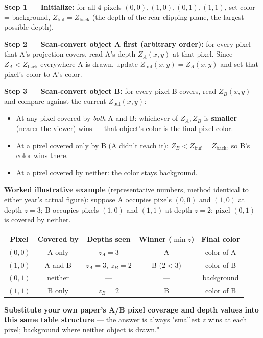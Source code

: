 \documentclass[12pt, a4paper]{article}
\newenvironment{solutionbox}{\begin{mdframed}[style=solutionframe]}{\end{mdframed}}
\begin{document}
\begin{solutionbox}
\textbf{Step 1 --- Initialize:} for all 4 pixels $(0,0),(1,0),(0,1),(1,1)$, set color = background, $Z_{\mathrm{buf}} = Z_{\mathrm{back}}$ (the depth of the rear clipping plane, the largest possible depth).

\textbf{Step 2 --- Scan-convert object A first (arbitrary order):} for every pixel that A's projection covers, read A's depth $Z_A(x,y)$ at that pixel. Since $Z_A < Z_{\mathrm{back}}$ everywhere A is drawn, update $Z_{\mathrm{buf}}(x,y)=Z_A(x,y)$ and set that pixel's color to A's color.

\textbf{Step 3 --- Scan-convert object B:} for every pixel B covers, read $Z_B(x,y)$ and compare against the current $Z_{\mathrm{buf}}(x,y)$:
\begin{itemize}[noitemsep]
  \item At any pixel covered by \emph{both} A and B: whichever of $Z_A,Z_B$ is \textbf{smaller} (nearer the viewer) wins --- that object's color is the final pixel color.
  \item At a pixel covered only by B (A didn't reach it): $Z_B < Z_{\mathrm{buf}}=Z_{\mathrm{back}}$, so B's color wins there.
  \item At a pixel covered by neither: the color stays background.
\end{itemize}

\textbf{Worked illustrative example} (representative numbers, method identical to either year's actual figure): suppose A occupies pixels $(0,0)$ and $(1,0)$ at depth $z=3$; B occupies pixels $(1,0)$ and $(1,1)$ at depth $z=2$; pixel $(0,1)$ is covered by neither.
\begin{center}
\begin{tabular}{ccccc}
\toprule
Pixel & Covered by & Depths seen & Winner ($\min z$) & Final color \\
\midrule
$(0,0)$ & A only & $z_A=3$ & A & color of A \\
$(1,0)$ & A and B & $z_A=3,\ z_B=2$ & B ($2<3$) & color of B \\
$(0,1)$ & neither & --- & --- & background \\
$(1,1)$ & B only & $z_B=2$ & B & color of B \\
\bottomrule
\end{tabular}
\end{center}
\textbf{Substitute your own paper's A/B pixel coverage and depth values into this same table structure} --- the answer is always "smallest $z$ wins at each pixel; background where neither object is drawn."
\end{solutionbox}
\end{document}
